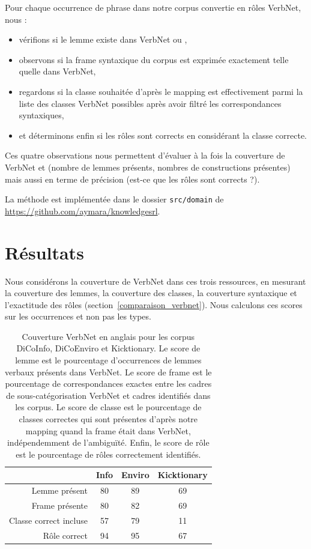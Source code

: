 Pour chaque occurrence de phrase dans notre corpus convertie en rôles VerbNet,
nous :
\begin{itemize}
    \item vérifions si le lemme existe dans VerbNet ou \verbenet{},
    \item observons si la frame syntaxique du corpus est exprimée exactement
        telle quelle dans VerbNet,
    \item regardons si la classe souhaitée d'après le mapping est effectivement
        parmi la liste des classes VerbNet possibles après avoir filtré les
        correspondances syntaxiques,
    \item et déterminons enfin si les rôles sont corrects en considérant la
        classe correcte.
\end{itemize}

Ces quatre observations nous permettent d'évaluer à la fois la couverture de
VerbNet et \verbenet{} (nombre de lemmes présents, nombres de constructions
présentes) mais aussi en terme de précision (est-ce que les rôles sont corrects
?).

La méthode est implémentée dans le dossier \texttt{src/domain} de
\url{https://github.com/aymara/knowledgesrl}.

\section{Résultats}
\label{sec:domainsrlresults}

Nous considérons la couverture de VerbNet dans ces trois ressources, en
mesurant la couverture des lemmes, la couverture des classes, la couverture
syntaxique et l'exactitude des rôles (section~\ref{comparaison_verbnet}). Nous
calculons ces scores sur les occurrences et non pas les types.

\begin{table}[h]
\centering
\begin{tabular}{rccc}
  \toprule
         & Info & Enviro & Kicktionary \\
  \midrule
  Lemme présent          & 80 & 89 & 69 \\
  Frame présente         & 80 & 82 & 69 \\
  Classe correct incluse & 57 & 79 & 11 \\
  Rôle correct           & 94 & 95 & 67 \\
  \bottomrule
\end{tabular}

\caption{\label{table:coverage} Couverture VerbNet en anglais pour les corpus
    DiCoInfo, DiCoEnviro et Kicktionary. Le score de lemme est le pourcentage
    d'occurrences de lemmes verbaux présents dans VerbNet. Le score de frame
    est le pourcentage de correspondances exactes entre les cadres de
    sous-catégorisation VerbNet et cadres identifiés dans les corpus. Le score
    de classe est le pourcentage de classes correctes qui sont présentes
    d'après notre mapping quand la frame était dans VerbNet, indépendemment de
l'ambiguïté. Enfin, le score de rôle est le pourcentage de rôles correctement
identifiés.}

\end{table}


